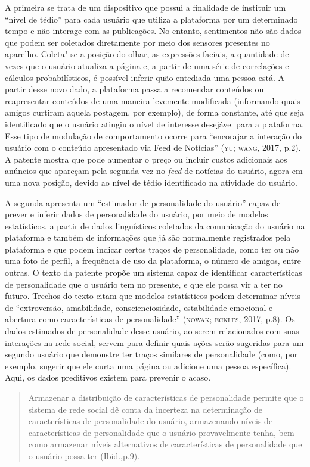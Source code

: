 A primeira se trata de um dispositivo que possui a finalidade de
instituir um ``nível de tédio'' para cada usuário que utiliza a
plataforma por um determinado tempo e não interage com as publicações.
No entanto, sentimentos não são dados que podem ser coletados
diretamente por meio dos sensores presentes no aparelho. Coleta"-se a
posição do olhar, as expressões faciais, a quantidade de vezes que o
usuário atualiza a página e, a partir de uma série de correlações e
cálculos probabilísticos, é possível inferir quão entediada uma pessoa
está. A partir desse novo dado, a plataforma passa a recomendar
conteúdos ou reapresentar conteúdos de uma maneira levemente modificada
(informando quais amigos curtiram aquela postagem, por exemplo), de
forma constante, até que seja identificado que o usuário atingiu o nível
de interesse desejável para a plataforma. Esse tipo de modulação de
comportamento ocorre para ``encorajar a interação do usuário com o
conteúdo apresentado via Feed de Notícias'' (\textsc{yu; wang}, 2017, p.2). A
patente mostra que pode aumentar o preço ou incluir custos adicionais
aos anúncios que apareçam pela segunda vez no \emph{feed} de notícias do usuário,
agora em uma nova posição, devido ao nível de tédio identificado na
atividade do usuário.

A segunda apresenta um ``estimador de personalidade do usuário'' capaz
de prever e inferir dados de personalidade do usuário, por meio de
modelos estatísticos, a partir de dados linguísticos coletados da
comunicação do usuário na plataforma e também de informações que já são
normalmente registrados pela plataforma e que podem indicar certos
traços de personalidade, como ter ou não uma foto de perfil, a
frequência de uso da plataforma, o número de amigos, entre outras. O
texto da patente propõe um sistema capaz de identificar características
de personalidade que o usuário tem no presente, e que ele possa vir a
ter no futuro. Trechos do texto citam que modelos estatísticos podem
determinar níveis de ``extroversão, amabilidade, conscienciosidade,
estabilidade emocional e abertura como características de
personalidade'' (\textsc{nowak; eckles}, 2017, p.8). Os dados estimados de
personalidade desse usuário, ao serem relacionados com suas interações
na rede social, servem para definir quais ações serão sugeridas para um
segundo usuário que demonstre ter traços similares de personalidade
(como, por exemplo, sugerir que ele curta uma página ou adicione uma
pessoa específica). Aqui, os dados preditivos existem para prevenir o
acaso.

\begin{quote}
Armazenar a distribuição de características de personalidade permite que
o sistema de rede social dê conta da incerteza na determinação de
características de personalidade do usuário, armazenando níveis de
características de personalidade que o usuário provavelmente tenha, bem
como armazenar níveis alternativos de características de personalidade
que o usuário possa ter (Ibid.,p.9).
\end{quote}

